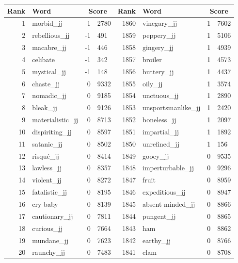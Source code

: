 \begin{table}[tbp]
    \begin{tabular}{| rlr@{.}l | rlr@{.}l |}
    \hline
    \textbf{Rank} & \textbf{Word} & \multicolumn{2}{c|}{\textbf{Score}} & \textbf{Rank} & \textbf{Word} & \multicolumn{2}{c|}{\textbf{Score}} \\
    \hline
    1 & morbid\_jj & -1 & 2780    &    1860 & vinegary\_jj & 1 & 7602 \\
    2 & rebellious\_jj & -1 & 491    &    1859 & peppery\_jj & 1 & 5106 \\
    3 & macabre\_jj & -1 & 446    &    1858 & gingery\_jj & 1 & 4939 \\
    4 & celibate & -1 & 342    &    1857 & broiler & 1 & 4573 \\
    5 & mystical\_jj & -1 & 148    &    1856 & buttery\_jj & 1 & 4437 \\
    6 & chaste\_jj & 0 & 9332    &    1855 & oily\_jj & 1 & 3574 \\
    7 & nomadic\_jj & 0 & 9185    &    1854 & unctuous\_jj & 1 & 2890 \\
    8 & bleak\_jj & 0 & 9126    &    1853 & unsportsmanlike\_jj & 1 & 2420 \\
    9 & materialistic\_jj & 0 & 8713    &    1852 & boneless\_jj & 1 & 2097 \\
    10 & dispiriting\_jj & 0 & 8597    &    1851 & impartial\_jj & 1 & 1892 \\
    11 & satanic\_jj & 0 & 8502    &    1850 & unrefined\_jj & 1 & 156 \\
    12 & risqué\_jj & 0 & 8414    &    1849 & gooey\_jj & 0 & 9535 \\
    13 & lawless\_jj & 0 & 8357    &    1848 & imperturbable\_jj & 0 & 9296 \\
    14 & violent\_jj & 0 & 8272    &    1847 & fruit & 0 & 8959 \\
    15 & fatalistic\_jj & 0 & 8195    &    1846 & expeditious\_jj & 0 & 8947 \\
    16 & cry-baby & 0 & 8139    &    1845 & absent-minded\_jj & 0 & 8866 \\
    17 & cautionary\_jj & 0 & 7811    &    1844 & pungent\_jj & 0 & 8865 \\
    18 & curious\_jj & 0 & 7664    &    1843 & ham & 0 & 8862 \\
    19 & mundane\_jj & 0 & 7623    &    1842 & earthy\_jj & 0 & 8766 \\
    20 & raunchy\_jj & 0 & 7483    &    1841 & clam & 0 & 8708 \\

\end{tabular}
\end{table}
